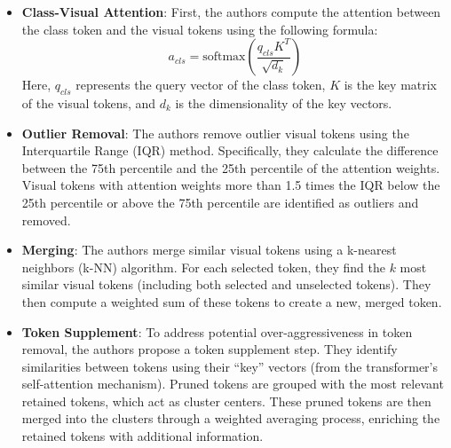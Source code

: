 \documentclass[onecolumn]{IEEEtran}
\begin{document}
\begin{itemize}
    \item \textbf{Class-Visual Attention}: First, the authors compute the attention between the class token and the visual tokens using the following formula:
    \begin{equation}
        a_{cls} = \text{softmax}\left(\frac{q_{cls} K^T}{\sqrt{d_k}}\right)
        \label{eq:attention}
    \end{equation}
    Here, $q_{cls}$ represents the query vector of the class token, $K$ is the key matrix of the visual tokens, and $d_k$ is the dimensionality of the key vectors.
    
    \item \textbf{Outlier Removal}: The authors remove outlier visual tokens using the Interquartile Range (IQR) method. Specifically, they calculate the difference between the 75th percentile and the 25th percentile of the attention weights. Visual tokens with attention weights more than 1.5 times the IQR below the 25th percentile or above the 75th percentile are identified as outliers and removed.
    
    \item \textbf{Merging}: The authors merge similar visual tokens using a k-nearest neighbors (k-NN) algorithm. For each selected token, they find the $k$ most similar visual tokens (including both selected and unselected tokens). They then compute a weighted sum of these tokens to create a new, merged token.
    
    \item \textbf{Token Supplement}: To address potential over-aggressiveness in token removal, the authors propose a token supplement step. They identify similarities between tokens using their “key” vectors (from the transformer’s self-attention mechanism). Pruned tokens are grouped with the most relevant retained tokens, which act as cluster centers. These pruned tokens are then merged into the clusters through a weighted averaging process, enriching the retained tokens with additional information.
\end{itemize}
\end{document}
